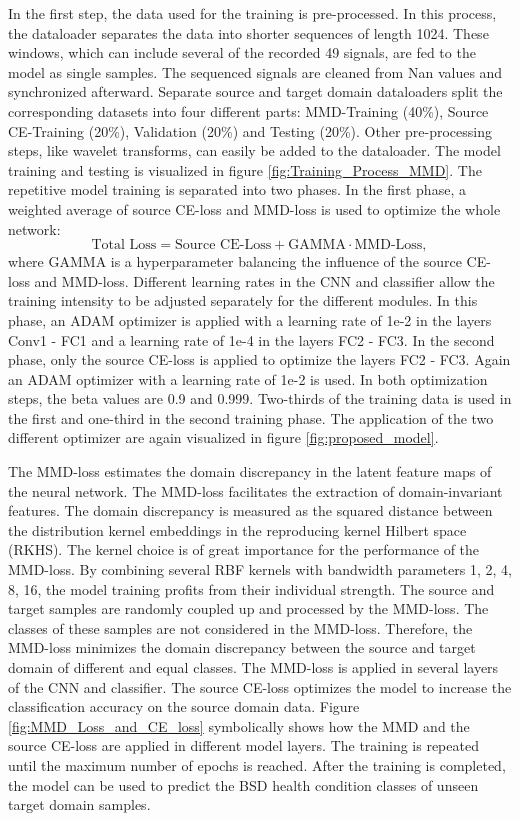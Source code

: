 In the first step, the data used for the training is pre-processed. In this process, the dataloader separates the data into shorter sequences of length 1024. These windows, which can include several of the recorded 49 signals, are fed to the model as single samples. The sequenced signals are cleaned from Nan values and synchronized afterward. Separate source and target domain dataloaders split the corresponding datasets into four different parts: MMD-Training (40\%), Source CE-Training (20\%), Validation (20\%) and Testing (20\%). Other pre-processing steps, like wavelet transforms, can easily be added to the dataloader. The model training and testing is visualized in figure \ref{fig:Training_Process_MMD}. The repetitive model training is separated into two phases. In the first phase, a weighted average of source CE-loss and MMD-loss is used to optimize the whole network: 
\begin{equation}
    \mbox{Total Loss} = \mbox{Source CE-Loss} + \mbox{GAMMA} \cdot \mbox{MMD-Loss}, 
\end{equation}
where GAMMA is a hyperparameter balancing the influence of the source CE-loss and MMD-loss. Different learning rates in the CNN and classifier allow the training intensity to be adjusted separately for the different modules. In this phase, an ADAM optimizer is applied with a learning rate of 1e-2 in the layers Conv1 - FC1 and a learning rate of 1e-4 in the layers FC2 - FC3. In the second phase, only the source CE-loss is applied to optimize the layers FC2 - FC3. Again an ADAM optimizer with a learning rate of 1e-2 is used. In both optimization steps, the beta values are 0.9 and 0.999. Two-thirds of the training data is used in the first and one-third in the second training phase. The application of the two different optimizer are again visualized in figure \ref{fig:proposed_model}.

The MMD-loss estimates the domain discrepancy in the latent feature maps of the neural network. The MMD-loss facilitates the extraction of domain-invariant features. The domain discrepancy is measured as the squared distance between the distribution kernel embeddings in the reproducing kernel Hilbert space (RKHS). The kernel choice is of great importance for the performance of the MMD-loss. By combining several RBF kernels with bandwidth parameters 1, 2, 4, 8, 16, the model training profits from their individual strength. The source and target samples are randomly coupled up and processed by the MMD-loss. The classes of these samples are not considered in the MMD-loss. Therefore, the MMD-loss minimizes the domain discrepancy between the source and target domain of different and equal classes. The MMD-loss is applied in several layers of the CNN and classifier. The source CE-loss optimizes the model to increase the classification accuracy on the source domain data. Figure \ref{fig:MMD_Loss_and_CE_loss} symbolically shows how the MMD and the source CE-loss are applied in different model layers. The training is repeated until the maximum number of epochs is reached. After the training is completed, the model can be used to predict the BSD health condition classes of unseen target domain samples. 



